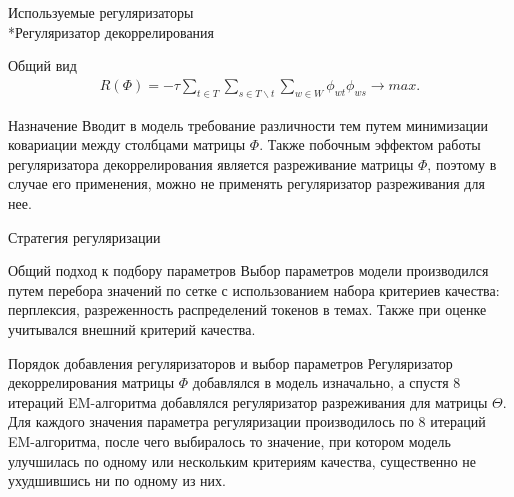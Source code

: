 \documentclass{beamer}
\begin{document}
\begin{frame}{Используемые регуляризаторы \\*Регуляризатор декоррелирования}
\begin{block}{Общий вид}
\begin{align*}
R(\Phi)=-\tau \sum_{t \in T}\sum_{s \in T\backslash t}\sum_{w \in W} \phi_{wt}\phi_{ws} \to max.
\end{align*} 
    \end{block}
\begin{block}{Назначение}
Вводит в модель требование различности тем путем минимизации ковариации между столбцами матрицы $\Phi$. Также побочным эффектом работы регуляризатора декоррелирования является разреживание матрицы $\Phi$, поэтому в случае его применения, можно не применять регуляризатор разреживания для нее.
    \end{block}
\end{frame}
\begin{frame}{Стратегия регуляризации}
\begin{block}{Общий подход к подбору параметров}
Выбор параметров модели производился путем перебора значений по сетке с использованием набора критериев качества: перплексия, разреженность распределений токенов в темах. Также при оценке учитывался внешний критерий качества. 
    \end{block}
\begin{block}{Порядок добавления регуляризаторов и выбор параметров}
Регуляризатор декоррелирования матрицы $\Phi$ добавлялся в модель изначально, а спустя 8 итераций EM-алгоритма добавлялся регуляризатор разреживания для матрицы $\Theta$. 
Для каждого значения параметра регуляризации производилось по 8 итераций EM-алгоритма, после чего выбиралось то значение, при котором модель улучшилась по одному или нескольким критериям качества, существенно не ухудшившись ни по одному из них.
    \end{block}
\end{frame}
\end{document}
